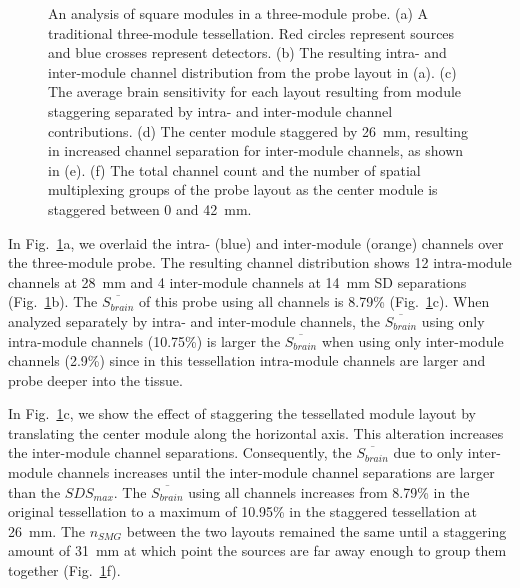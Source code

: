 \begin{figure}
\begin{center}
\end{center}
\caption {An analysis of square modules in a three-module probe. (a) A traditional three-module tessellation. Red circles represent sources and blue crosses represent detectors. (b) The resulting intra- and inter-module channel distribution from the probe layout in (a). (c) The average brain sensitivity for each layout resulting from module staggering separated by intra- and inter-module channel contributions. (d) The center module staggered by 26~mm, resulting in increased channel separation for inter-module channels, as shown in (e). (f) The total channel count and the number of spatial multiplexing groups of the probe layout as the center module is staggered between 0 and 42~mm.}
 \label{fig:stagger}
\end{figure} 

In Fig.~\ref{fig:stagger}a, we overlaid the intra- (blue) and inter-module (orange) channels over the three-module probe. The resulting channel distribution shows 12 intra-module channels at 28~mm and 4 inter-module channels at 14~mm SD separations (Fig.~\ref{fig:stagger}b). The $\overline{S_{brain}}$ of this probe using all channels is 8.79\% (Fig.~\ref{fig:stagger}c). When analyzed separately by intra- and inter-module channels, the $\overline{S_{brain}}$ using only intra-module channels (10.75\%) is larger the $\overline{S_{brain}}$ when using only inter-module channels (2.9\%) since in this tessellation intra-module channels are larger and probe deeper into the tissue.  

In Fig.~\ref{fig:stagger}c, we show the effect of staggering the tessellated module layout by translating the center module along the horizontal axis. This alteration increases the inter-module channel separations. Consequently, the $\overline{S_{brain}}$ due to only inter-module channels increases until the inter-module channel separations are larger than the $SDS_{max}$. The $\overline{S_{brain}}$ using all channels increases from 8.79\% in the original tessellation to a maximum of 10.95\% in the staggered tessellation at 26~mm. The $n_{SMG}$ between the two layouts remained the same until a staggering amount of 31~mm at which point the sources are far away enough to group them together (Fig.~\ref{fig:stagger}f). 



